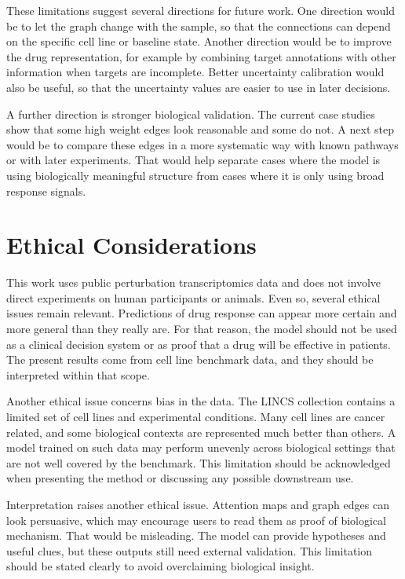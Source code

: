 \noindent These limitations suggest several directions for future work. One direction would be to let the graph change with the sample, so that the connections can depend on the specific cell line or baseline state. Another direction would be to improve the drug representation, for example by combining target annotations with other information when targets are incomplete. Better uncertainty calibration would also be useful, so that the uncertainty values are easier to use in later decisions.

\noindent A further direction is stronger biological validation. The current case studies show that some high weight edges look reasonable and some do not. A next step would be to compare these edges in a more systematic way with known pathways or with later experiments. That would help separate cases where the model is using biologically meaningful structure from cases where it is only using broad response signals.

\section{Ethical Considerations}
\noindent This work uses public perturbation transcriptomics data and does not involve direct experiments on human participants or animals. Even so, several ethical issues remain relevant. Predictions of drug response can appear more certain and more general than they really are. For that reason, the model should not be used as a clinical decision system or as proof that a drug will be effective in patients. The present results come from cell line benchmark data, and they should be interpreted within that scope.

\noindent Another ethical issue concerns bias in the data. The LINCS collection contains a limited set of cell lines and experimental conditions. Many cell lines are cancer related, and some biological contexts are represented much better than others. A model trained on such data may perform unevenly across biological settings that are not well covered by the benchmark. This limitation should be acknowledged when presenting the method or discussing any possible downstream use.

\noindent Interpretation raises another ethical issue. Attention maps and graph edges can look persuasive, which may encourage users to read them as proof of biological mechanism. That would be misleading. The model can provide hypotheses and useful clues, but these outputs still need external validation. This limitation should be stated clearly to avoid overclaiming biological insight.

